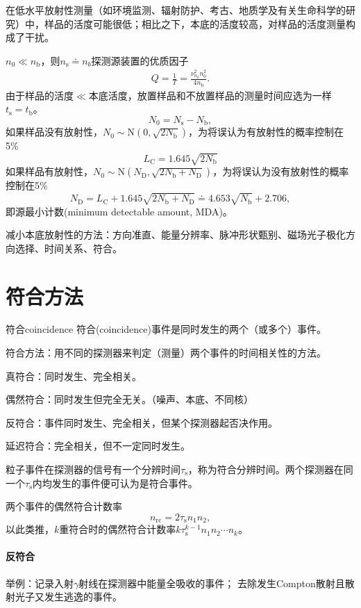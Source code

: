 在低水平放射性测量（如环境监测、辐射防护、考古、地质学及有关生命科学的研究）中，样品的活度可能很低；相比之下，本底的活度较高，对样品的活度测量构成了干扰。

$n_0\ll n_\mathrm b$，则$n_\mathrm s\doteq n_b$探测源装置的优质因子
\begin{align}
	Q=\frac1T=\frac{\nu_{n_0}^2n_0^2}{4n_\mathrm b}.
\end{align}
由于样品的活度$\ll$本底活度，放置样品和不放置样品的测量时间应选为一样$t_\mathrm s=t_\mathrm b$。
\[
	N_0=N_\mathrm s-N_\mathrm b,
\]
如果样品没有放射性，$N_0\sim\mathrm N(0,\sqrt{2N_\mathrm b})$，为将误认为有放射性的概率控制在5\%
\[
	L_\mathrm C=1.645\sqrt{2 N_\mathrm b}
\]
如果样品有放射性，$N_0\sim\mathrm N(N_\mathrm D,\sqrt{2N_\mathrm b+N_\mathrm D})$，为将误认为没有放射性的概率控制在5\%
\[
	N_\mathrm D=L_\mathrm C+1.645\sqrt{2N_\mathrm b+N_\mathrm D}\doteq 4.653\sqrt{N_\mathrm b}+2.706,
\]
即源最小计数(minimum detectable amount, MDA)。

减小本底放射性的方法：方向准直、能量分辨率、脉冲形状甄别、磁场光子极化方向选择、时间关系、符合。

\section{符合方法}

\begin{definition}{符合}{coincidence}
	符合(coincidence)事件是同时发生的两个（或多个）事件。

	符合方法：用不同的探测器来判定（测量）两个事件的时间相关性的方法。

	真符合：同时发生、完全相关。

	偶然符合：同时发生但完全无关。（噪声、本底、不同核）

	反符合：事件同时发生、完全相关，但某个探测器起否决作用。

	延迟符合：完全相关，但不一定同时发生。
\end{definition}
粒子事件在探测器的信号有一个分辨时间$\tau_\mathrm s$，称为符合分辨时间。两个探测器在同一个$\tau_\mathrm s$内均发生的事件便可认为是符合事件。

两个事件的偶然符合计数率
\[
	n_{\mathrm{rc}}=2\tau_\mathrm sn_1n_2,
\]
以此类推，$k$重符合时的偶然符合计数率$k\tau_\mathrm s^{k-1}n_1n_2\cdots n_{k}$。
\paragraph{反符合}
举例：记录入射$\gamma$射线在探测器中能量全吸收的事件；
去除发生Compton散射且散射光子又发生逃逸的事件。
